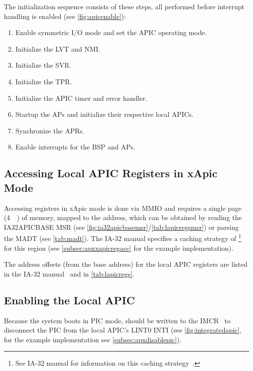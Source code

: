 The initialization sequence consists of these steps, all performed before interrupt handling is enabled (see \autoref{fig:apicenable}):

\begin{enumerate}
  \item Enable symmetric I/O mode and set the APIC operating mode.
  \item Initialize the LVT and NMI\@.
  \item Initialize the SVR\@.
  \item Initialize the TPR\@.
  \item Initialize the APIC timer and error handler.
  \item Startup the APs and initialize their respective local APICs.
  \item Synchronize the APRs.
  \item Enable interrupts for the BSP and APs.
\end{enumerate}

\subsection{Accessing Local APIC Registers in xApic Mode}
\label{subsec:xapicregacc}

Accessing registers in xApic mode is done via MMIO and requires a single page (\SI{4}{\kilo\byte}) of memory, mapped to the  address, which can be obtained by reading the IA32\textunderscore{}APIC\textunderscore{}BASE MSR (see \autoref{fig:ia32apicbasemsr}/\autoref{tab:lapicregsmsr}) or parsing the MADT (see \autoref{tab:madt}).
The IA-32 manual specifies a caching strategy of \footnote{
  See IA-32 manual for information on this caching strategy~\autocite[sec.~3.12.3]{ia32}.}
~\autocite[sec.~3.11.4.1]{ia32} for this region (see \autoref{subsec:apxxapicregacc} for the example implementation).

The address offsets (from the base address) for the local APIC registers are listed in the IA-32 manual~\autocite[sec.~3.11.4.1]{ia32} and in \autoref{tab:lapicregs}.

\subsection{Enabling the Local APIC}
\label{subsec:lapicenable}

Because the system boots in PIC mode,  should be written to the IMCR~\autocite[sec.~3.6.2.1]{mpspec} to disconnect the PIC from the local APIC's LINT0 INTI (see \autoref{fig:integratedapic}, for the example implementation see \autoref{subsec:apxdisablepic}).


